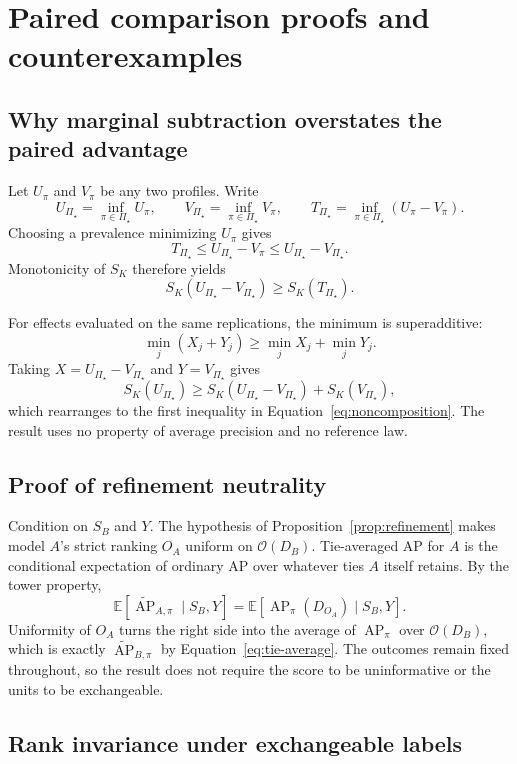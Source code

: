 \documentclass[11pt]{article}
\newcommand{\AP}{\operatorname{AP}}
\newcommand{\PSet}{\Pi_\star}
\newcommand{\E}{\mathbb{E}}
\newcommand{\APta}{\widetilde{\AP}}
\theoremstyle{remark}
\begin{document}
\section{Paired comparison proofs and counterexamples}
\label{app:paired-proofs}

\subsection{Why marginal subtraction overstates the paired advantage}

Let $U_\pi$ and $V_\pi$ be any two profiles. Write
\[
U_{\PSet}=\inf_{\pi\in\PSet}U_\pi,
\qquad
V_{\PSet}=\inf_{\pi\in\PSet}V_\pi,
\qquad
T_{\PSet}=\inf_{\pi\in\PSet}(U_\pi-V_\pi).
\]
Choosing a prevalence minimizing $U_\pi$ gives
\[
T_{\PSet}
\leq
U_{\PSet}-V_\pi
\leq
U_{\PSet}-V_{\PSet}.
\]
Monotonicity of $S_K$ therefore yields
\[
S_K(U_{\PSet}-V_{\PSet})
\geq
S_K(T_{\PSet}).
\]

For effects evaluated on the same replications, the minimum is superadditive:
\[
\min_j(X_j+Y_j)
\geq
\min_jX_j+\min_jY_j.
\]
Taking $X=U_{\PSet}-V_{\PSet}$ and $Y=V_{\PSet}$ gives
\[
S_K(U_{\PSet})
\geq
S_K(U_{\PSet}-V_{\PSet})+S_K(V_{\PSet}),
\]
which rearranges to the first inequality in Equation~\eqref{eq:noncomposition}. The result uses no property of average precision and no reference law.

\subsection{Proof of refinement neutrality}

Condition on $S_B$ and $Y$. The hypothesis of Proposition~\ref{prop:refinement} makes model $A$'s strict ranking $O_A$ uniform on $\mathcal O(D_B)$. Tie-averaged AP for $A$ is the conditional expectation of ordinary AP over whatever ties $A$ itself retains. By the tower property,
\[
\E[\APta_{A,\pi}\mid S_B,Y]
=
\E[\AP_\pi(D_{O_A})\mid S_B,Y].
\]
Uniformity of $O_A$ turns the right side into the average of $\AP_\pi$ over $\mathcal O(D_B)$, which is exactly $\APta_{B,\pi}$ by Equation~\eqref{eq:tie-average}. The outcomes remain fixed throughout, so the result does not require the score to be uninformative or the units to be exchangeable.

\subsection{Rank invariance under exchangeable labels}
\end{document}
